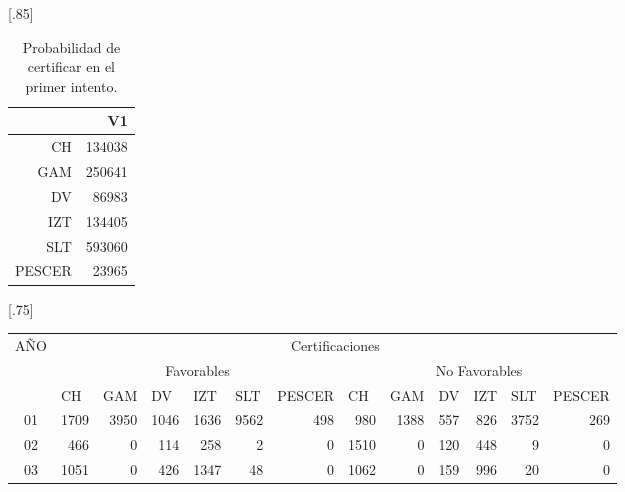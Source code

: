 \documentclass[12pt]{article}
\begin{document}
\begin{table}[ht!]
\centering
\scalebox{0.75}[.85]{
\begin{tabular}{rr}
  \hline
 & V1 \\ 
  \hline
CH & 134038 \\ 
  GAM & 250641 \\ 
  DV & 86983 \\ 
  IZT & 134405 \\ 
  SLT & 593060 \\ 
  PESCER & 23965 \\ 
   \hline
\end{tabular}
}
\caption{\label{Prob_Cert_Intento_1}Probabilidad de certificar en el primer intento.}
\end{table}


\begin{table}[ht]
\centering
\scalebox{0.75}[.75]{
\begin{tabular}{||c||rrrrrr||rrrrrr||}
\hline\hline
\multicolumn{1}{||c||}{\multirow{3}{*}{AÑO}} & \multicolumn{12}{c||}{Certificaciones}                                                                                                                                                                                                                                                                                               \\ \cline{2-13} 
\multicolumn{1}{||c||}{}& \multicolumn{6}{c||}{Favorables}                                                                                                                                  & \multicolumn{6}{c||}{No Favorables}                                                                                                                               \\ \cline{2-13} 
\multicolumn{1}{||c||}{}& \multicolumn{1}{l|}{CH} & \multicolumn{1}{l|}{GAM} & \multicolumn{1}{l|}{DV} & \multicolumn{1}{l|}{IZT} & \multicolumn{1}{l|}{SLT} & \multicolumn{1}{l||}{PESCER} & \multicolumn{1}{l|}{CH} & \multicolumn{1}{l|}{GAM} & \multicolumn{1}{l|}{DV} & \multicolumn{1}{l|}{IZT} & \multicolumn{1}{l|}{SLT} & \multicolumn{1}{l||}{PESCER} \\ \hline
01 &  1709 & 3950 & 1046 & 1636 & 9562 & 498&  980 & 1388 &  557 &  826 & 3752  &  269\\
  02 & 466 & 0 & 114 & 258 & 2 & 0& 1510 &    0  & 120 &  448 &    9  &    0\\
  03 & 1051 & 0 & 426 & 1347 & 48 & 0 & 1062 &    0  & 159 &  996 &   20  &    0\\

\end{tabular}}
\end{table}
\end{document}
